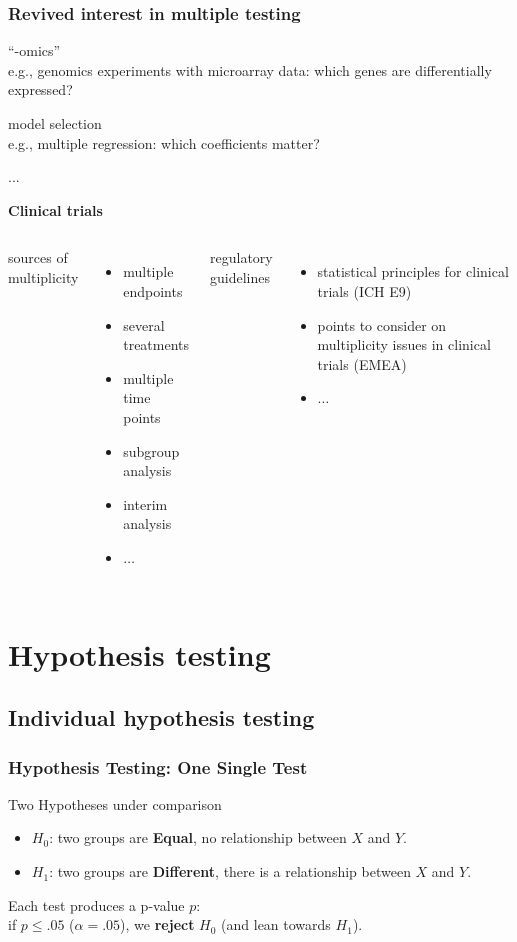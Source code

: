 \documentclass[xcolor={dvipsnames}]{beamer}
\newcommand{\rbf}[1]{\textcolor{redUnipd}{ #1}}
\begin{document}
\begin{frame}
\frametitle{Revived interest in multiple testing}

\large{``-omics''}   \\
\scriptsize{e.g., genomics experiments with microarray data: which genes are differentially expressed?}

\large{model selection}\\
\scriptsize{e.g., multiple regression: which coefficients matter?}

\large{...}


\textbf{\rbf{Clinical trials}}
\begin{columns}[t]
\textcolor{cambridgedarkorange}{sources of multiplicity}
\begin{itemize}
\item multiple endpoints
\item several treatments
\item multiple time points
\item subgroup analysis
\item interim analysis
\item $\ldots$
\end{itemize}

\textcolor{cambridgedarkorange}{regulatory guidelines}
\begin{itemize}
\item statistical principles for clinical trials (ICH E9)
\item points
to consider on multiplicity issues in clinical
trials (EMEA)
\item $\ldots$
\end{itemize}
\end{columns}




\end{frame}

\section{Hypothesis testing}

\subsection{Individual hypothesis testing}
\begin{frame}
\frametitle{Hypothesis Testing: One Single Test}

\rbf{Two Hypotheses under comparison}

\begin{itemize}
\item $H_0$: two groups are \textbf{Equal}, no relationship between $X$ and $Y$. 
\item $H_1$: two groups are \textbf{Different}, there is a relationship between $X$ and $Y$.
\end{itemize}

\bigskip

Each test produces a p-value $p$: \\  
\vspace{.5cm}
if $\boxed{p\leq .05}$ ($\alpha=.05$), we \textbf{reject} $H_0$ (and lean towards $H_1$).
\end{frame}
\end{document}
